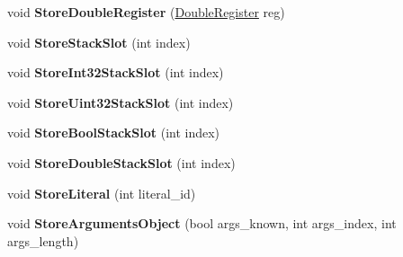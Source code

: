 \begin{DoxyCompactItemize}
\item 
void {\bfseries Store\+Double\+Register} (\hyperlink{structv8_1_1internal_1_1_double_register}{Double\+Register} reg)\hypertarget{classv8_1_1internal_1_1_b_a_s_e___e_m_b_e_d_d_e_d_a8cd7abe8e0e5ce33e5d34cee3b2b3bea}{}\label{classv8_1_1internal_1_1_b_a_s_e___e_m_b_e_d_d_e_d_a8cd7abe8e0e5ce33e5d34cee3b2b3bea}

\item 
void {\bfseries Store\+Stack\+Slot} (int index)\hypertarget{classv8_1_1internal_1_1_b_a_s_e___e_m_b_e_d_d_e_d_a39c6ea94e2bd58ee012c75072e793468}{}\label{classv8_1_1internal_1_1_b_a_s_e___e_m_b_e_d_d_e_d_a39c6ea94e2bd58ee012c75072e793468}

\item 
void {\bfseries Store\+Int32\+Stack\+Slot} (int index)\hypertarget{classv8_1_1internal_1_1_b_a_s_e___e_m_b_e_d_d_e_d_ab119c97efc1223fb6d89825b3edbaa67}{}\label{classv8_1_1internal_1_1_b_a_s_e___e_m_b_e_d_d_e_d_ab119c97efc1223fb6d89825b3edbaa67}

\item 
void {\bfseries Store\+Uint32\+Stack\+Slot} (int index)\hypertarget{classv8_1_1internal_1_1_b_a_s_e___e_m_b_e_d_d_e_d_a91bcb7f832d533416df37715206f29ea}{}\label{classv8_1_1internal_1_1_b_a_s_e___e_m_b_e_d_d_e_d_a91bcb7f832d533416df37715206f29ea}

\item 
void {\bfseries Store\+Bool\+Stack\+Slot} (int index)\hypertarget{classv8_1_1internal_1_1_b_a_s_e___e_m_b_e_d_d_e_d_acfb3a21ecbdf72d04f9a512aa22e0170}{}\label{classv8_1_1internal_1_1_b_a_s_e___e_m_b_e_d_d_e_d_acfb3a21ecbdf72d04f9a512aa22e0170}

\item 
void {\bfseries Store\+Double\+Stack\+Slot} (int index)\hypertarget{classv8_1_1internal_1_1_b_a_s_e___e_m_b_e_d_d_e_d_a71b95eec7df1380003720e83b1ce36f0}{}\label{classv8_1_1internal_1_1_b_a_s_e___e_m_b_e_d_d_e_d_a71b95eec7df1380003720e83b1ce36f0}

\item 
void {\bfseries Store\+Literal} (int literal\+\_\+id)\hypertarget{classv8_1_1internal_1_1_b_a_s_e___e_m_b_e_d_d_e_d_a8dbaf3a0eea5d5530b167b4aea1d5578}{}\label{classv8_1_1internal_1_1_b_a_s_e___e_m_b_e_d_d_e_d_a8dbaf3a0eea5d5530b167b4aea1d5578}

\item 
void {\bfseries Store\+Arguments\+Object} (bool args\+\_\+known, int args\+\_\+index, int args\+\_\+length)\hypertarget{classv8_1_1internal_1_1_b_a_s_e___e_m_b_e_d_d_e_d_a2e861b01dfbe7f736be6d030cda1c7c6}{}\label{classv8_1_1internal_1_1_b_a_s_e___e_m_b_e_d_d_e_d_a2e861b01dfbe7f736be6d030cda1c7c6}


\end{DoxyCompactItemize}
